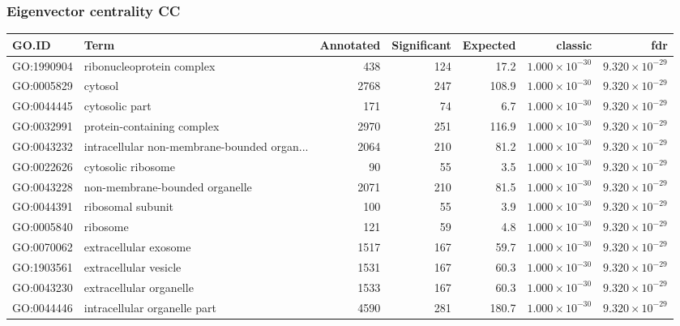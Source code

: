 \subsubsection{Eigenvector centrality CC}
\begin{table}[ht]
\centering
\begin{adjustbox}{width=\textwidth}

\begin{tabular}{llrrrrr}
  \hline
GO.ID & Term & Annotated & Significant & Expected & classic & fdr \\ 
  \hline
GO:1990904 & ribonucleoprotein complex & 438 & 124 & 17.2 & $1.000 \times 10^{-30}$ & $9.320 \times 10^{-29}$ \\ 
  GO:0005829 & cytosol & 2768 & 247 & 108.9 & $1.000 \times 10^{-30}$ & $9.320 \times 10^{-29}$ \\ 
  GO:0044445 & cytosolic part & 171 & 74 & 6.7 & $1.000 \times 10^{-30}$ & $9.320 \times 10^{-29}$ \\ 
  GO:0032991 & protein-containing complex & 2970 & 251 & 116.9 & $1.000 \times 10^{-30}$ & $9.320 \times 10^{-29}$ \\ 
  GO:0043232 & intracellular non-membrane-bounded organ... & 2064 & 210 & 81.2 & $1.000 \times 10^{-30}$ & $9.320 \times 10^{-29}$ \\ 
  GO:0022626 & cytosolic ribosome & 90 & 55 & 3.5 & $1.000 \times 10^{-30}$ & $9.320 \times 10^{-29}$ \\ 
  GO:0043228 & non-membrane-bounded organelle & 2071 & 210 & 81.5 & $1.000 \times 10^{-30}$ & $9.320 \times 10^{-29}$ \\ 
  GO:0044391 & ribosomal subunit & 100 & 55 & 3.9 & $1.000 \times 10^{-30}$ & $9.320 \times 10^{-29}$ \\ 
  GO:0005840 & ribosome & 121 & 59 & 4.8 & $1.000 \times 10^{-30}$ & $9.320 \times 10^{-29}$ \\ 
  GO:0070062 & extracellular exosome & 1517 & 167 & 59.7 & $1.000 \times 10^{-30}$ & $9.320 \times 10^{-29}$ \\ 
  GO:1903561 & extracellular vesicle & 1531 & 167 & 60.3 & $1.000 \times 10^{-30}$ & $9.320 \times 10^{-29}$ \\ 
  GO:0043230 & extracellular organelle & 1533 & 167 & 60.3 & $1.000 \times 10^{-30}$ & $9.320 \times 10^{-29}$ \\ 
  GO:0044446 & intracellular organelle part & 4590 & 281 & 180.7 & $1.000 \times 10^{-30}$ & $9.320 \times 10^{-29}$ \\ 

\end{tabular}
\end{adjustbox}
\end{table}
